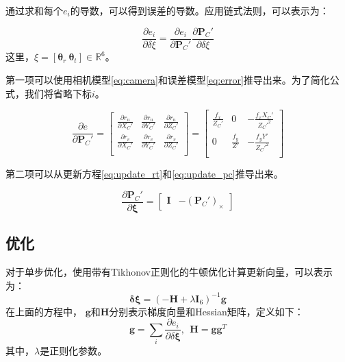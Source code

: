 通过求和每个$e_i$的导数，可以得到误差的导数。应用链式法则，可以表示为：

\begin{equation}
    \frac{\partial e_i}{\partial \delta \xi}=
\frac{\partial e_i}{\partial \mathbf{P}_C'} \frac{\partial \mathbf{P}_C'}{\partial \delta \xi}
\label{eq:dedxi}
\end{equation}
这里，$\xi=[\mathbf{\theta}_r \  \mathbf{\theta}_t] \in \mathbb{R}^6$。

第一项可以使用相机模型\autoref{eq:camera}和误差模型\autoref{eq:error}推导出来。为了简化公式，我们将省略下标$i$。

\begin{equation}
\frac{\partial e}{\partial \mathbf{P}_C'}=
\begin{bmatrix}
\frac{\partial r_{u}}{\partial X_C'}&\frac{\partial r_{u}}{\partial Y_C'}&\frac{\partial r_{u}}{\partial Z_C'}\\[5pt]\frac{\partial r_{v}}{\partial X_C'}&\frac{\partial r_{v}}{\partial Y_C'}&\frac{\partial r_{v}}{\partial Z_C'}\\ 
\end{bmatrix}
=
\begin{bmatrix}\frac{f_x}{Z_C'}&0&-\frac{f_x X_C'}{Z_C'^{2}}\\0&\frac{f_y}{Z'}&-\frac{f_y Y'}{Z_C'^{2}}\\ 
\end{bmatrix}
\label{eq:dedPC}
\end{equation}

第二项可以从更新方程\autoref{eq:update_rt}和\autoref{eq:update_pc}推导出来。

\begin{equation}
    \frac{\partial \mathbf{P}_C'}{\partial \mathbf{\xi}}=
\begin{bmatrix}
\mathbf{I} & -(\mathbf{P}_C')_{\times}
\end{bmatrix}
\label{eq:dPCdxi}
\end{equation}

\subsection{优化}

对于单步优化，使用带有Tikhonov正则化的牛顿优化计算更新向量，可以表示为：
\begin{equation}
\mathbf{\delta \xi} = 
  \left( 
    -\mathbf{H} + 
    \lambda \mathbf{I}_{6}
  \right)^{-1}\mathbf{g}
\label{eq:delta_si}
\end{equation}
在上面的方程中，
$\mathbf{g}$和$\mathbf{H}$分别表示梯度向量和Hessian矩阵，定义如下：
\begin{equation}
    \mathbf{g} = \sum_{i}\frac{\partial e_i}{\partial \delta \mathbf{\xi}}, \ \ \mathbf{H} = \mathbf{g} \mathbf{g}^T
\label{eq:gH}
\end{equation}
其中，$\lambda$是正则化参数。

